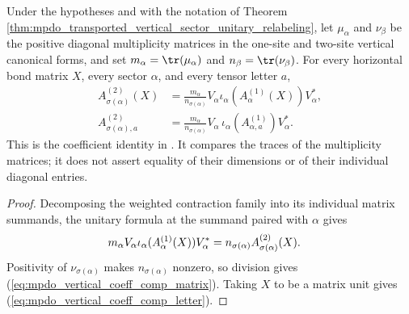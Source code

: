 \begin{lemma}
    \label{thm:mpdo_transported_vertical_sector_coefficient_comparison}
    \leanok
    Under the hypotheses and with the notation of Theorem~
    \ref{thm:mpdo_transported_vertical_sector_unitary_relabeling}, let
    $\mu_\alpha$ and $\nu_\beta$ be the positive diagonal multiplicity
    matrices in the one-site and two-site vertical canonical forms, and set
    $m_\alpha=\tr(\mu_\alpha)$ and $n_\beta=\tr(\nu_\beta)$.
    For every horizontal bond matrix $X$, every sector $\alpha$, and every
    tensor letter $a$,
    \begin{align}
        A^{(2)}_{\sigma(\alpha)}(X)
         & =\frac{m_\alpha}{n_{\sigma(\alpha)}}
        V_\alpha
        \iota_\alpha(A^{(1)}_\alpha(X))V_\alpha^*,
        \label{eq:mpdo_vertical_coeff_comp_matrix} \\
        A^{(2)}_{\sigma(\alpha),a}
         & =\frac{m_\alpha}{n_{\sigma(\alpha)}}
        V_\alpha\,\iota_\alpha
        (A^{(1)}_{\alpha,a})V_\alpha^*.
        \label{eq:mpdo_vertical_coeff_comp_letter}
    \end{align}
    This is the coefficient identity in
    \cite[Appendix~C.4, lines~2001--2008]{Cirac2016MPDO_arXiv}. It compares
    the traces of the multiplicity matrices; it does not assert equality of
    their dimensions or of their individual diagonal entries.
\end{lemma}

\begin{proof}\leanok
    Decomposing the weighted contraction family into its individual matrix
    summands, the unitary formula at the summand paired with $\alpha$ gives
    \begin{align}
        m_\alpha V_\alpha
        \iota_\alpha(A^{(1)}_\alpha(X))V_\alpha^*
         & =n_{\sigma(\alpha)}A^{(2)}_{\sigma(\alpha)}(X).
        \notag
    \end{align}
    Positivity of $\nu_{\sigma(\alpha)}$ makes
    $n_{\sigma(\alpha)}$ nonzero, so division gives
    (\ref{eq:mpdo_vertical_coeff_comp_matrix}).
    Taking $X$ to be a matrix unit gives
    (\ref{eq:mpdo_vertical_coeff_comp_letter}).
\end{proof}


